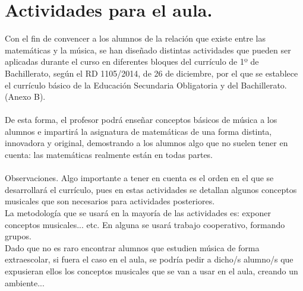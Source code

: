 \documentclass[a4paper, openright, 11pt, titlepage]{report}
\theoremstyle{definition}\newtheorem{defin}[propo]{Definition}
\theoremstyle{definition}\newtheorem{obser}[propo]{Remark}
\theoremstyle{definition}\newtheorem{ejem}[propo]{Ejemplo}
\theoremstyle{definition}\newtheorem{algoritmo}[propo]{Algoritmo}
\begin{document}
\chapter{Actividades para el aula.}
Con el fin de convencer a los alumnos de la relación que existe entre las matemáticas y la música, se han diseñado distintas actividades que pueden ser aplicadas durante el curso en diferentes bloques del currículo de 1º de Bachillerato, según el RD 1105/2014, de 26 de diciembre, por el que se establece el currículo básico de la Educación Secundaria Obligatoria y del Bachillerato. (Anexo B).\\\\
De esta forma, el profesor podrá enseñar conceptos básicos de música a los alumnos e impartirá la asignatura de matemáticas de una forma distinta, innovadora y original, demostrando a los alumnos algo que no suelen tener en cuenta: las matemáticas realmente están en todas partes.\\\\
Observaciones. Algo importante a tener en cuenta es el orden en el que se desarrollará el currículo, pues en estas actividades se detallan algunos conceptos musicales que son necesarios para actividades posteriores.\\
La metodología que se usará en la mayoría de las actividades es: exponer conceptos musicales... etc. En alguna se usará trabajo cooperativo, formando grupos. \\
Dado que no es raro encontrar alumnos que estudien música de forma extraescolar, si fuera el caso en el aula, se podría pedir a dicho/s alumno/s que expusieran ellos los conceptos musicales que se van a usar en el aula, creando un ambiente...

\end{document}
